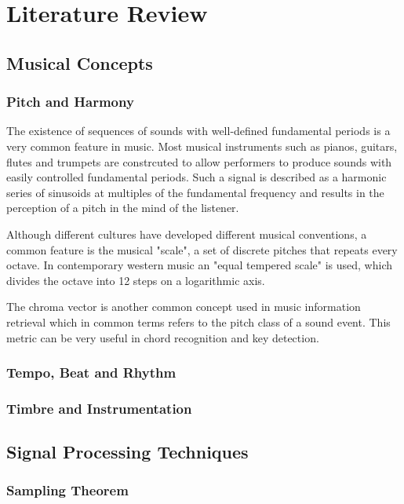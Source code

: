  

\chapter{Literature Review}
\label{ch:review}
\vspace{2em}

\section{Musical Concepts}
\subsection{Pitch and Harmony}
The existence of sequences of sounds with well-defined fundamental periods is a
very common feature in music. Most musical instruments such as pianos, guitars,
flutes and trumpets are constrcuted to allow performers to produce sounds with
easily controlled fundamental periods. Such a signal is described as a harmonic
series of sinusoids at multiples of the fundamental frequency and results in the
perception of a pitch in the mind of the listener.

Although different cultures have developed different musical conventions, a
common feature is the musical "scale", a set of discrete pitches that repeats
every octave. In contemporary western music an "equal tempered scale" is used,
which divides the octave into 12 steps on a logarithmic axis.

The chroma vector is another common concept used in music information retrieval
which in common terms refers to the pitch class of a sound event. This metric
can be very useful in chord recognition and key detection.
\cite{NUS-perceptual-features:Ye}

\subsection{Tempo, Beat and Rhythm}

\subsection{Timbre and Instrumentation}


\section{Signal Processing Techniques}
\subsection{Sampling Theorem}

